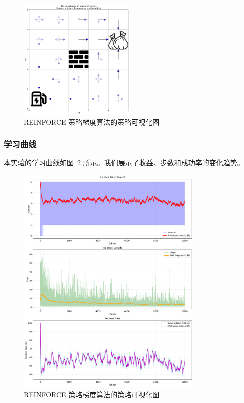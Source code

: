 \begin{figure}[htbp] 
    \centering 
    \includegraphics[width=0.5\textwidth]{figure/sweep_robot/REINFORCE/policy_visualization.png} 
    \caption{REINFORCE 策略梯度算法的策略可视化图}\label{fig:REINFORCE_policy} 
\end{figure}

\subsubsection{学习曲线}

本实验的学习曲线如图~\ref{fig:REINFORCE_training} 所示。我们展示了收益、步数和成功率的变化趋势。

\begin{figure}[htbp] 
    \centering 
    \includegraphics[width=0.8\textwidth]{figure/sweep_robot/REINFORCE/training_results.png} 
    \caption{REINFORCE 策略梯度算法的策略可视化图}\label{fig:REINFORCE_training} 
\end{figure}

